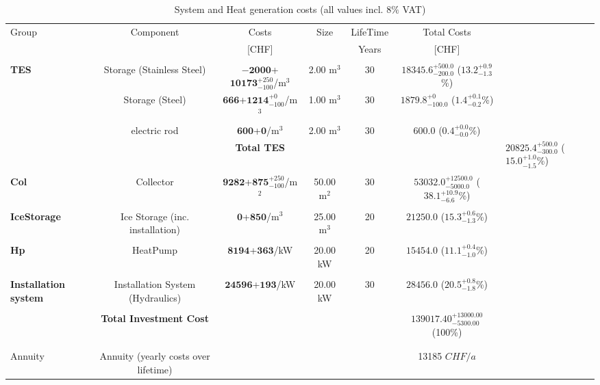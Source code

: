 \documentclass[english]{SPFShortReport}
\begin{document}
\begin{table}[!ht]
\centering
\caption{System and Heat generation costs (all values incl. 8$\%$ VAT) }
\begin{adjustbox}{max width =\textwidth}
\begin{tabular}{l | c c c c c } 
\hline
\hline
Group &Component &Costs &Size &LifeTime &Total Costs \\ 
 & &[CHF] & &Years &[CHF]\\ 
\hline
\\
\textbf{TES} & Storage (Stainless Steel) & $\mathbf{-2000}$+$\mathbf{10173}^{+250}_{-100}$/m$^3$ & 2.00 m$^3$ & 30 & $\mathbf{18345.6}^{+500.0}_{-200.0}$ ($\mathbf{13.2}^{+0.9}_{-1.3}$\%) \\
 & Storage (Steel) & $\mathbf{666}$+$\mathbf{1214}^{+0}_{-100}$/m$^3$ & 1.00 m$^3$ & 30 & $\mathbf{1879.8}^{+0}_{-100.0}$ ($\mathbf{1.4}^{+0.1}_{-0.2}$\%) \\
 & electric rod & $\mathbf{600}$+$\mathbf{0}$/m$^3$ & 2.00 m$^3$ & 30 & $\mathbf{600.0}$ ($\mathbf{0.4}^{+0.0}_{-0.0}$\%) \\
&
 & \textbf{Total TES} & & & & $\mathbf{20825.4}^{+500.0}_{-300.0}$ ($\mathbf{15.0}^{+1.0}_{-1.5}$\%) \\
\hline \\
\textbf{Col} & Collector & $\mathbf{9282}$+$\mathbf{875}^{+250}_{-100}$/m$^2$ & 50.00 m$^2$ & 30 & $\mathbf{53032.0}^{+12500.0}_{-5000.0}$ ($\mathbf{38.1}^{+10.9}_{-6.6}$\%) \\
\hline \\
\textbf{IceStorage} & Ice Storage (inc. installation) & $\mathbf{0}$+$\mathbf{850}$/m$^3$ & 25.00 m$^3$ & 20 & $\mathbf{21250.0}$ ($\mathbf{15.3}^{+0.6}_{-1.3}$\%) \\
\hline \\
\textbf{Hp} & HeatPump & $\mathbf{8194}$+$\mathbf{363}$/kW & 20.00 kW & 20 & $\mathbf{15454.0}$ ($\mathbf{11.1}^{+0.4}_{-1.0}$\%) \\
\hline \\
\textbf{Installation system} & Installation System (Hydraulics) & $\mathbf{24596}$+$\mathbf{193}$/kW & 20.00 kW & 30 & $\mathbf{28456.0}$ ($\mathbf{20.5}^{+0.8}_{-1.8}$\%) \\
\hline \\
 & \textbf{Total Investment Cost} & & & & \textbf{$\mathbf{139017.40}^{+13000.00}_{-5300.00}$} (100\%) \\ 
\hline \\ 
\hline \\ 
Annuity & Annuity (yearly costs over lifetime)  &&& & 13185 $CHF/a$  \\ 

\end{tabular}
\end{adjustbox}
\end{table}
\end{document}
